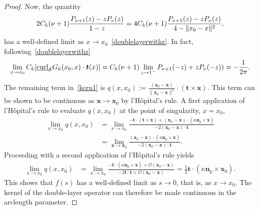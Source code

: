 \begin{proof}
Now, the quantity
\begin{align*}
  2C_k(\nu+1)\frac{P_{\nu+1}(z)-zP_{\nu}(z)}{1-z}
  =4C_k(\nu+1)\frac{P_{\nu+1}(z)-zP_{\nu}(z)}{4-\|{x_0}-{x}\|^2},
\end{align*}
has a well-defined limit as $x \rightarrow
x_{0}$~\eqref{doublelayerwithz}. In fact,
following~\eqref{doublelayerwithz}
\begin{align*}
  \lim_{x\rightarrow x_0} 
  \C[\underline{\mbox{curl}}_{\S}G_{k}(x_{0},x) \cdot \vec{t}(x)] 
  = \C(\nu+1)\lim_{z\rightarrow 1^-}
  P_{\nu+1}(-z)+zP_{\nu}(-z)) = -\frac{1}{2\pi}.
\end{align*}

The remaining term in~\eqref{kern1} is $q(x,x_0) :=
\frac{(\mathbf{x}_{0}-\mathbf{x})}{\|\mathbf{x}_{0}-\mathbf{x}\|^2}
\cdot \left( \mathbf{t} \times \mathbf{x} \right).$  This term can be
shown to be continuous as $\mathbf{x} \rightarrow \mathbf{x}_{0}$ by
l'H\^{o}pital's rule.  A first application of l'H\^{o}pital's rule to
evaluate $q(x,x_0)$ at the point of singularity, $x = x_{0}$, 
\begin{align*}
  \lim_{x \rightarrow x_{0}}q(x,x_{0}) & = 
  \lim_{x \rightarrow x_{0}} 
  \frac{ -\mathbf{t} \cdot \left(\mathbf{t} \times \mathbf{x} \right)
  + (\mathbf{x}_{0}-\mathbf{x}) \cdot \left( \kappa \mathbf{n}_{p}
  \times \mathbf{x} \right)}
  {-2(\mathbf{x}_{0} - \mathbf{x}) \cdot \mathbf{t}} \\
  & = \lim_{\mathbf{x} \rightarrow \mathbf{x}_{0}} 
  \frac{(\mathbf{x}_{0}-\mathbf{x}) \cdot \left(
  \kappa\mathbf{n}_{p} \times \mathbf{x}\right)}
  {-2(\mathbf{x}_{0} - \mathbf{x}) \cdot \mathbf{t}}. 
\end{align*}
Proceeding with a second application of l'H\^{o}pital's rule yields
\begin{align*}
  \lim_{x \rightarrow x_{0}} q(x,x_0)  
  & = \lim_{x \rightarrow x_{0}} \frac{-\mathbf{t} \cdot 
  \left( \kappa \mathbf{n}_{p} \times \mathbf{x} \right) +
  \mathcal{O}(\mathbf{x}_{0}-\mathbf{x})}
  {-2\mathbf{t} \cdot \mathbf{t} + \mathcal{O}(\mathbf{x}_{0}-\mathbf{x})}
  = \frac{1}{2} \mathbf{t} \cdot \left( \kappa \mathbf{n}_{p} \times 
  \mathbf{x}_{0} \right).
\end{align*}
This shows that $f(s)$ has a well-defined limit as $s\rightarrow 0$,
that is, as $x \rightarrow x_0$. The kernel of the double-layer operator
can therefore be made continuous in the arclength parameter.


\end{proof}
